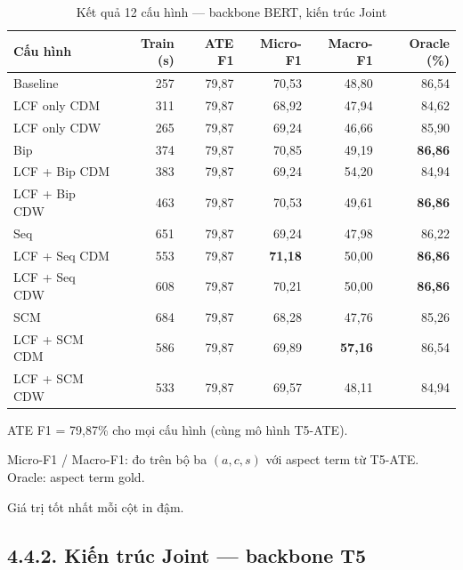 \begin{table}[H]
\centering
\small
\caption{Kết quả 12 cấu hình — backbone BERT, kiến trúc Joint}
\label{tab:bert_results}
\begin{threeparttable}
\begin{tabular}{@{}lrrrrr@{}}
\toprule
\textbf{Cấu hình} & \textbf{Train (s)} & \textbf{ATE F1} & \textbf{Micro-F1} & \textbf{Macro-F1} & \textbf{Oracle (\%)} \\
\midrule
Baseline               & 257 & 79,87 & 70,53 & 48,80 & 86,54 \\
\midrule
LCF only CDM           & 311 & 79,87 & 68,92 & 47,94 & 84,62 \\
LCF only CDW           & 265 & 79,87 & 69,24 & 46,66 & 85,90 \\
\midrule
Bip                    & 374 & 79,87 & 70,85 & 49,19 & \textbf{86,86} \\
LCF + Bip CDM          & 383 & 79,87 & 69,24 & 54,20 & 84,94 \\
LCF + Bip CDW          & 463 & 79,87 & 70,53 & 49,61 & \textbf{86,86} \\
\midrule
Seq                    & 651 & 79,87 & 69,24 & 47,98 & 86,22 \\
LCF + Seq CDM          & 553 & 79,87 & \textbf{71,18} & 50,00 & \textbf{86,86} \\
LCF + Seq CDW          & 608 & 79,87 & 70,21 & 50,00 & \textbf{86,86} \\
\midrule
SCM                   & 684 & 79,87 & 68,28 & 47,76 & 85,26 \\
LCF + SCM CDM         & 586 & 79,87 & 69,89 & \textbf{57,16} & 86,54 \\
LCF + SCM CDW         & 533 & 79,87 & 69,57 & 48,11 & 84,94 \\
\bottomrule
\end{tabular}
\begin{tablenotes}
  \small
  \item ATE F1 = 79,87\% cho mọi cấu hình (cùng mô hình T5-ATE).
  \item Micro-F1 / Macro-F1: đo trên bộ ba $(a, c, s)$ với aspect term
        từ T5-ATE. Oracle: aspect term gold.
  \item Giá trị tốt nhất mỗi cột in đậm.
\end{tablenotes}
\end{threeparttable}
\end{table}

\subsection{4.4.2.\; Kiến trúc Joint — backbone T5}

